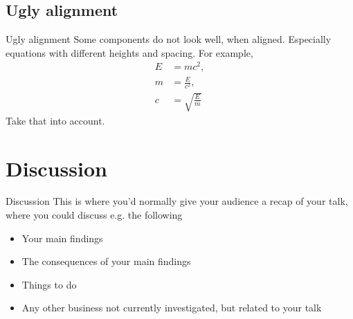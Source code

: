 \documentclass{beamer}
\begin{document}
\subsection{Ugly alignment}
\begin{frame}{Ugly alignment}
Some components do not look well, when aligned. Especially equations with different heights and spacing. For example,
\begin{align}
E &= mc^2, \\
m &= \frac{E}{c^2}, \\
c &= \sqrt{\frac{E}{m}}
\end{align}
Take that into account.
\end{frame}

\section{Discussion}
\begin{frame}{Discussion}
This is where you’d normally give your audience a recap of your talk, where you could discuss e.g. the following
\begin{itemize}
    \item Your main findings
    \item The consequences of your main findings
    \item Things to do
    \item Any other business not currently investigated, but related to your talk
\end{itemize}    
\end{frame}
\end{document}
